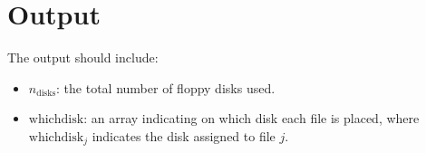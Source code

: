 \documentclass{article}
\begin{document}
\section*{Output}
The output should include:
\begin{itemize}
    \item \( n_{\text{disks}} \): the total number of floppy disks used.
    \item \( \text{whichdisk} \): an array indicating on which disk each file is placed, where \( \text{whichdisk}_j \) indicates the disk assigned to file \( j \).
\end{itemize}
\end{document}
